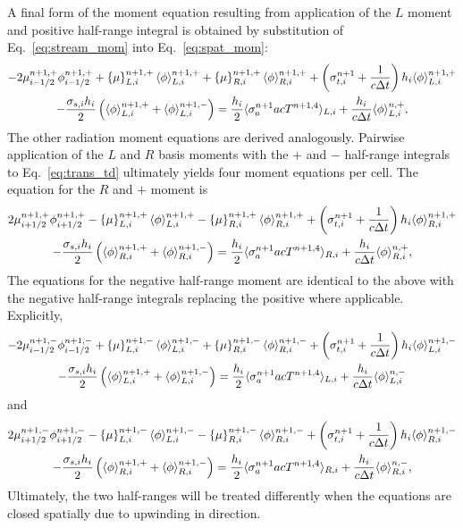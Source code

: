 A final form of the moment equation resulting from application of the $L$ moment and
positive half-range integral is obtained by substitution of 
Eq.~\eqref{eq:stream_mom} into Eq.~\eqref{eq:spat_mom}:
\begin{multline}\label{eq:exact_lmomp}
    -2{\mu}_{i-1/2}^{n+1,+} \phi_{i-1/2}^{n+1,+} + \left\{ \mu \right\}_{L,i}^{n+1,+}
  \langle \phi \rangle_{L,i}^{n+1,+}
  +  \left\{ \mu \right\}_{R,i}^{n+1,+}
  \langle \phi \rangle_{R,i}^{n+1,+} +  \left(\sigma_{t,i}^{n+1}+\frac{1}{c \Delta t} \right) h_i 
  \langle \phi \rangle_{L,i}^{n+1,+} \\-  \frac{\sigma_{s,i} h_i}{2} \left( \langle \phi \rangle_{L,i}^{n+1,+} +
  \langle \phi \rangle_{L,i}^{n+1,-}\right) = \frac{h_i}{2} \langle \sigma_a^{n+1} a c T^{n+1,4} \rangle_{L,i} +
  \frac{h_i}{c\Delta t}\langle \phi \rangle_{L,i}^{n,+},
\end{multline}
The other radiation moment equations are derived analogously.  
Pairwise application of the $L$ and $R$ basis
moments with the $+$ and $-$ half-range integrals to Eq.~\eqref{eq:trans_td} 
ultimately yields four moment
equations per cell.  The equation for the $R$ and $+$ moment is
\begin{multline}\label{eq:exact_rmomp}
    2{\mu}_{i+1/2}^{n+1,+} \phi_{i+1/2}^{n+1,+} - \left\{ \mu \right\}_{L,i}^{n+1,+}
  \langle \phi \rangle_{L,i}^{n+1,+}
  -  \left\{ \mu \right\}_{R,i}^{n+1,+}
  \langle \phi \rangle_{R,i}^{n+1,+} +  \left(\sigma_{t,i}^{n+1}+\frac{1}{c \Delta t} \right) h_i 
  \langle \phi \rangle_{R,i}^{n+1,+} \\-  \frac{\sigma_{s,i} h_i}{2} \left( \langle \phi \rangle_{R,i}^{n+1,+} +
  \langle \phi \rangle_{R,i}^{n+1,-}\right) = \frac{h_i}{2} \langle \sigma_a^{n+1} a c T^{n+1,4} \rangle_{R,i} +
  \frac{h_i}{c\Delta t}\langle \phi \rangle_{R,i}^{n,+},
\end{multline}
The equations for the negative half-range moment are identical to the above with the
negative half-range integrals replacing the positive where applicable.  Explicitly,
\begin{multline}\label{eq:exact_lmomm}
    -2{\mu}_{i-1/2}^{n+1,-} \phi_{i-1/2}^{n+1,-} + \left\{ \mu \right\}_{L,i}^{n+1,-}
  \langle \phi \rangle_{L,i}^{n+1,-}
  +  \left\{ \mu \right\}_{R,i}^{n+1,-}
  \langle \phi \rangle_{R,i}^{n+1,-} +  \left(\sigma_{t,i}^{n+1}+\frac{1}{c \Delta t} \right) h_i 
  \langle \phi \rangle_{L,i}^{n+1,-} \\-  \frac{\sigma_{s,i} h_i}{2} \left( \langle \phi \rangle_{L,i}^{n+1,+} +
  \langle \phi \rangle_{L,i}^{n+1,-}\right) = \frac{h_i}{2} \langle \sigma_a^{n+1} a c T^{n+1,4} \rangle_{L,i} +
  \frac{h_i}{c\Delta t}\langle \phi \rangle_{L,i}^{n,-}
\end{multline}
and
\begin{multline}\label{eq:exact_rmomm}
    2{\mu}_{i+1/2}^{n+1,-} \phi_{i+1/2}^{n+1,-} - \left\{ \mu \right\}_{L,i}^{n+1,-}
  \langle \phi \rangle_{L,i}^{n+1,-}
  -  \left\{ \mu \right\}_{R,i}^{n+1,-}
  \langle \phi \rangle_{R,i}^{n+1,-} +  \left(\sigma_{t,i}^{n+1}+\frac{1}{c \Delta t} \right) h_i 
  \langle \phi \rangle_{R,i}^{n+1,-} \\-  \frac{\sigma_{s,i} h_i}{2} \left( \langle \phi \rangle_{R,i}^{n+1,+} +
  \langle \phi \rangle_{R,i}^{n+1,-}\right) = \frac{h_i}{2} \langle \sigma_a^{n+1} a c T^{n+1,4} \rangle_{R,i} +
  \frac{h_i}{c\Delta t}\langle \phi \rangle_{R,i}^{n,-},
\end{multline}
Ultimately, the two half-ranges will be treated differently when the equations are closed
spatially due to upwinding in direction.

